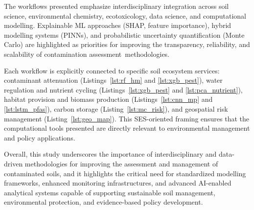 \documentclass[environremediat,article,accept,pdftex,oneauthor]{Definitions/mdpi}
\begin{document}
{The workflows presented emphasize interdisciplinary integration across soil science, environmental chemistry, ecotoxicology, data science, and computational modelling. Explainable ML approaches (SHAP, feature importance), hybrid modelling systems (PINNs), and probabilistic uncertainty quantification (Monte Carlo) are highlighted as priorities for improving the transparency, reliability, and scalability of contamination \mbox{assessment methodologies.}}

{Each workflow is explicitly connected to specific soil ecosystem services: contaminant attenuation (Listings~\ref{lst:rf_hm} and \ref{lst:xgb_pest}), water regulation and nutrient cycling (Listings~\ref{lst:xgb_pest} and \ref{lst:pca_nutrient}), habitat provision and biomass production (Listings~\ref{lst:cnn_mp} and \ref{lst:lstm_pfas}), carbon storage (Listing~\ref{lst:mc_risk}), and geospatial risk management (Listing~\ref{lst:geo_map}). This SES-oriented framing ensures that the computational tools presented are directly relevant to environmental management and policy applications.}

Overall, this study underscores the importance of interdisciplinary and data-driven methodologies for improving the assessment and management of contaminated soils, and it highlights the critical need for standardized modelling frameworks, enhanced monitoring infrastructures, and advanced AI-enabled analytical systems capable of supporting sustainable soil management, environmental protection, and evidence-based policy development.



\end{document}
